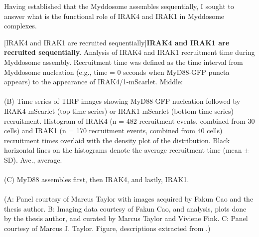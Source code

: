Having established that the Myddosome assembles sequentially, I sought to answer what is the functional role of IRAK4 and IRAK1 in Myddosome complexes.


\begin{centering}
\captionsetup{parbox=none}
[IRAK4 and IRAK1 are recruited sequentially]{\textbf{IRAK4 and IRAK1 are recruited sequentially.} Analysis of IRAK4 and IRAK1 recruitment time during Myddosome assembly. Recruitment time was defined as the time interval from Myddosome nucleation (e.g., time = 0 seconds when MyD88-GFP puncta appears) to the appearance of IRAK4/1-mScarlet. Middle: 
\\
\\
(B) Time series of TIRF images showing MyD88-GFP nucleation followed by IRAK4-mScarlet (top time series) or IRAK1-mScarlet (bottom time series) recruitment. Histogram of IRAK4 (n = 482 recruitment events, combined from 30 cells) and IRAK1 (n = 170 recruitment events, combined from 40 cells) recruitment times overlaid with the density plot of the distribution. Black horizontal lines on the histograms denote the average recruitment time (mean $\pm$ SD). Ave., average.
\\
\\
(C) MyD88 assembles first, then IRAK4, and lastly, IRAK1.
\\
\\
(A: Panel courtesy of Marcus Taylor with images acquired by Fakun Cao and the thesis author. B:  Imaging data courtesy of Fakun Cao, and analysis, plots done by the thesis author, and curated by Marcus Taylor and Viviene Fink. C: Panel courtesy of Marcus J. Taylor. Figure, descriptions extracted from \autocite{Deliz-Aguirre_2021}.)}
\label{p1:4c}
\end{centering}

